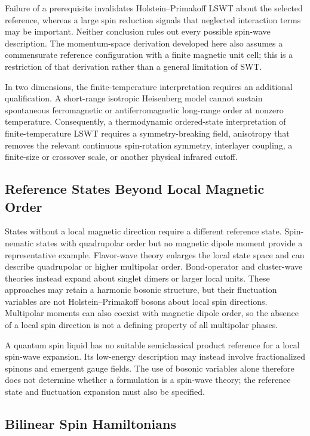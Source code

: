 Failure of a prerequisite invalidates Holstein--Primakoff LSWT about the selected reference, whereas a large spin reduction signals that neglected interaction terms may be important. Neither conclusion rules out every possible spin-wave description. The momentum-space derivation developed here also assumes a commensurate reference configuration with a finite magnetic unit cell; this is a restriction of that derivation rather than a general limitation of SWT.

In two dimensions, the finite-temperature interpretation requires an additional qualification. A short-range isotropic Heisenberg model cannot sustain spontaneous ferromagnetic or antiferromagnetic long-range order at nonzero temperature. Consequently, a thermodynamic ordered-state interpretation of finite-temperature LSWT requires a symmetry-breaking field, anisotropy that removes the relevant continuous spin-rotation symmetry, interlayer coupling, a finite-size or crossover scale, or another physical infrared cutoff.

\subsection{Reference States Beyond Local Magnetic Order}

States without a local magnetic direction require a different reference state. Spin-nematic states with quadrupolar order but no magnetic dipole moment provide a representative example. Flavor-wave theory enlarges the local state space and can describe quadrupolar or higher multipolar order. Bond-operator and cluster-wave theories instead expand about singlet dimers or larger local units. These approaches may retain a harmonic bosonic structure, but their fluctuation variables are not Holstein--Primakoff bosons about local spin directions. Multipolar moments can also coexist with magnetic dipole order, so the absence of a local spin direction is not a defining property of all multipolar phases.

A quantum spin liquid has no suitable semiclassical product reference for a local spin-wave expansion. Its low-energy description may instead involve fractionalized spinons and emergent gauge fields. The use of bosonic variables alone therefore does not determine whether a formulation is a spin-wave theory; the reference state and fluctuation expansion must also be specified.

\subsection{Bilinear Spin Hamiltonians}

